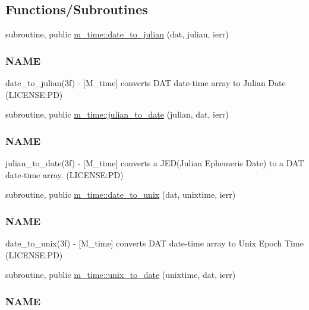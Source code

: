 \subsection*{Functions/\+Subroutines}
\begin{DoxyCompactItemize}
\item 
subroutine, public \mbox{\hyperlink{namespacem__time_acfdc970b4154b0c15bd33727636e3992}{m\+\_\+time\+::date\+\_\+to\+\_\+julian}} (dat, julian, ierr)
\begin{DoxyCompactList}\small\item\em \subsubsection*{N\+A\+ME}

date\+\_\+to\+\_\+julian(3f) -\/ \mbox{[}M\+\_\+time\mbox{]} converts D\+AT date-\/time array to Julian Date (L\+I\+C\+E\+N\+SE\+:PD) \end{DoxyCompactList}\item 
subroutine, public \mbox{\hyperlink{namespacem__time_abb44cf18cd0a3e420c20469efb056203}{m\+\_\+time\+::julian\+\_\+to\+\_\+date}} (julian, dat, ierr)
\begin{DoxyCompactList}\small\item\em \subsubsection*{N\+A\+ME}

julian\+\_\+to\+\_\+date(3f) -\/ \mbox{[}M\+\_\+time\mbox{]} converts a J\+E\+D(\+Julian Ephemeris Date) to a D\+AT date-\/time array. (L\+I\+C\+E\+N\+SE\+:PD) \end{DoxyCompactList}\item 
subroutine, public \mbox{\hyperlink{namespacem__time_aed245c691853279ebf0ce899dec9caa9}{m\+\_\+time\+::date\+\_\+to\+\_\+unix}} (dat, unixtime, ierr)
\begin{DoxyCompactList}\small\item\em \subsubsection*{N\+A\+ME}

date\+\_\+to\+\_\+unix(3f) -\/ \mbox{[}M\+\_\+time\mbox{]} converts D\+AT date-\/time array to Unix Epoch Time (L\+I\+C\+E\+N\+SE\+:PD) \end{DoxyCompactList}\item 
subroutine, public \mbox{\hyperlink{namespacem__time_acc62ada23f8fa2fe67b428702fbcbf1c}{m\+\_\+time\+::unix\+\_\+to\+\_\+date}} (unixtime, dat, ierr)
\begin{DoxyCompactList}\small\item\em \subsubsection*{N\+A\+ME}


\end{DoxyCompactList}
\end{DoxyCompactItemize}
